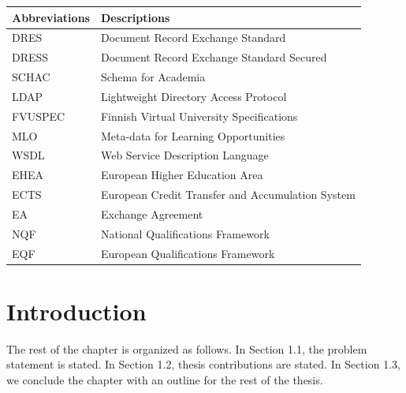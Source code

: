\documentclass[12pt,a4paper,oneside]{book}
\begin{document}
\begin{table}[h]
    \renewcommand{\arraystretch}{1.3}
    \label{table:table1}
     \begin{tabular}{ll}
        \hline\hline
            {\bfseries Abbreviations} & {\bfseries Descriptions} \\
            \hline                                      %
            DRES & Document Record Exchange Standard  \\
            DRESS & Document Record Exchange Standard Secured  \\
            SCHAC & Schema for Academia  \\
            LDAP & Lightweight Directory Access Protocol \\
            FVUSPEC & Finnish Virtual University Specifications  \\
            MLO & Meta-data for Learning Opportunities  \\
            WSDL & Web Service Description Language  \\
            EHEA & European Higher Education Area  \\
            ECTS & European Credit Transfer and Accumulation System  \\
            EA & Exchange Agreement  \\
            NQF & National Qualifications Framework  \\
            EQF & European Qualifications Framework  \\
            \hline                          %
    \end{tabular}
\end{table}

\listoffigures
\listoftables

\resetpagenumbering

\chapter{Introduction}\label{ch-intro}

The rest of the chapter is organized as follows. In Section 1.1, the problem statement is stated. In Section 1.2, thesis contributions are stated. In Section 1.3, we conclude the chapter with an outline for the rest of the thesis.
\end{document}
